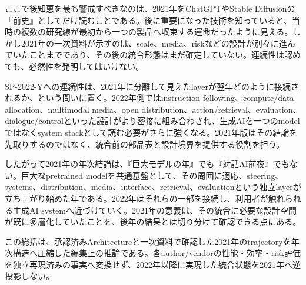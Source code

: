 ここで後知恵を最も警戒すべきなのは、2021年をChatGPTやStable Diffusionの『前史』としてだけ読むことである。後に重要になった技術を知っていると、当時の複数の研究線が最初から一つの製品へ収束する運命だったように見える。しかし2021年の一次資料が示すのは、scale、media、riskなどの設計が別々に進んでいたことまでであり、その後の統合形態はまだ確定していない。連続性は認めても、必然性を発明してはいけない。\autocite{src-20fd9bba2e7a,src-50244427230b,src-b307b4b82867}


SP-2022-Yへの連続性は、2021年に分離して見えたlayerが翌年どのように接続されるか、という問いに置く。2022年側ではinstruction following、compute/data allocation、multimodal media、open distribution、action/retrieval、evaluation、dialogue/controlといった設計がより密接に組み合わされ、生成AIを一つのmodelではなくsystem stackとして読む必要がさらに強くなる。2021年版はその結論を先取りするのではなく、統合前の部品表と設計境界を提供する役割を担う。\autocite{src-20fd9bba2e7a,src-50244427230b,src-a4561c635fe6,src-b307b4b82867}


したがって2021年の年次結論は、『巨大モデルの年』でも『対話AI前夜』でもない。巨大なpretrained modelを共通基盤として、その周囲に適応、steering、systems、distribution、media、interface、retrieval、evaluationという独立layerが立ち上がり始めた年である。2022年はそれらの一部を接続し、利用者が触れられる生成AI systemへ近づけていく。2021年の意義は、その統合に必要な設計空間が既に多層化していたことを、後年の結果とは切り分けて確認できる点にある。\autocite{src-20fd9bba2e7a,src-50244427230b,src-a4561c635fe6,src-b307b4b82867}


\begin{claimboundary}
この総括は、承認済みArchitectureと一次資料で確認した2021年のtrajectoryを年次構造へ圧縮した編集上の推論である。各author/vendorの性能・効率・risk評価を独立再現済みの事実へ変換せず、2022年以降に実現した統合状態を2021年へ逆投影しない。\autocite{src-20fd9bba2e7a,src-50244427230b,src-a4561c635fe6,src-b307b4b82867}
\end{claimboundary}
